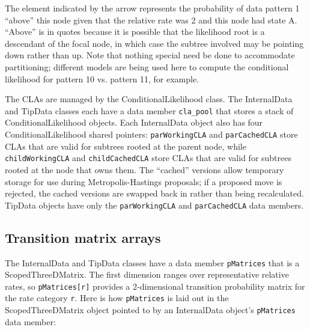 The element indicated by the arrow represents the probability of data pattern 1 ``above'' this node given that the relative rate was 2 and this node had state A. ``Above'' is in quotes because it is possible that the likelihood root is a descendant of the focal node, in which case the subtree involved may be pointing down rather than up. Note that nothing special need be done to accommodate partitioning; different models are being used here to compute the conditional likelihood for pattern 10 vs. pattern 11, for example.

The CLAs are managed by the ConditionalLikelihood class. The InternalData and TipData classes each have a data member {\tt cla\_pool} that stores a stack of ConditionalLikelihood objects. Each InternalData object also has four ConditionalLikelihood shared pointers: {\tt parWorkingCLA} and {\tt parCachedCLA} store CLAs that are valid for subtrees rooted at the parent node, while {\tt childWorkingCLA} and {\tt childCachedCLA} store CLAs that are valid for subtrees rooted at the node that owns them. The ``cached'' versions allow temporary storage for use during Metropolis-Hastings proposals; if a proposed move is rejected, the cached versions are swapped back in rather than being recalculated. TipData objects have only the {\tt parWorkingCLA} and {\tt parCachedCLA} data members.

\subsection{Transition matrix arrays}

The InternalData and TipData classes have a data member {\tt pMatrices} that is a ScopedThreeDMatrix. The first dimension ranges over representative relative rates, so {\tt pMatrices[r]} provides a 2-dimensional transition probability matrix for the rate category {\tt r}. Here is how {\tt pMatrices} is laid out in the ScopedThreeDMatrix object pointed to by an InternalData object's {\tt pMatrices} data member:

